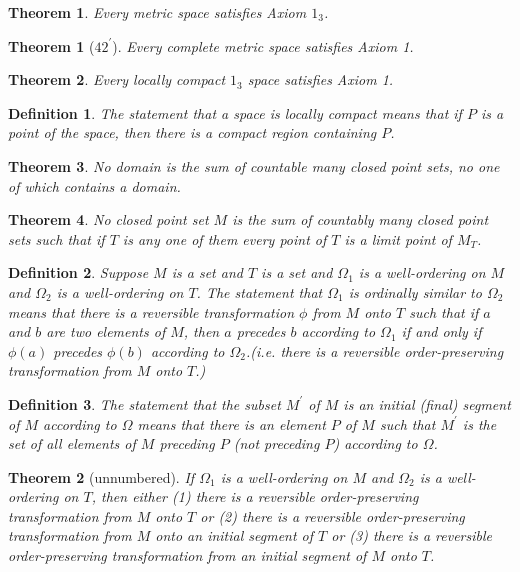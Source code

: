 \documentclass[10pt]{report}
\newtheorem{theorem}{Theorem}
\newtheorem*{theorem*}{Theorem}
\newtheorem{definition}{Definition}
\begin{document}
\begin{theorem}
 Every metric space satisfies Axiom $1_3$.
\end{theorem}

\begin{theorem*}[$42^\prime$]
 Every complete metric space satisfies Axiom 1.
\end{theorem*}

\begin{theorem}
 Every locally compact $1_3$ space satisfies Axiom 1.
\end{theorem}

\begin{definition}
 The statement that a space is locally compact means that if $P$ is a point of the space, then there is a compact
region containing $P$.
\end{definition}

\begin{theorem}
 No domain is the sum of countable many closed point sets, no one of which contains a domain.
\end{theorem}

\begin{theorem}
 No closed point set $M$ is the sum of countably many closed point sets such that if $T$ is any one of them every point
of $T$ is a limit point of $M_T$.
\end{theorem}

\begin{definition}
 Suppose $M$ is a set and $T$ is a set and $\Omega_1$ is a well-ordering on $M$ and $\Omega_2$ is a well-ordering on
$T$. The statement that $\Omega_1$ is ordinally similar to $\Omega_2$ means that there is a reversible transformation
$\phi$ from $M$ onto $T$ such that if $a$ and $b$ are two elements of $M$, then $a$ precedes $b$ according to $\Omega_1$
if and only if $\phi(a)$ precedes $\phi(b)$ according to $\Omega_2$.(i.e. there is a reversible order-preserving
transformation from $M$ onto $T$.)
\end{definition}

\begin{definition}
 The statement that the subset $M^\prime$ of $M$ is an initial (final) segment of $M$ according to $\Omega$ means that
there is an element $P$ of $M$ such that $M^\prime$ is the set of all elements of $M$ preceding $P$ (not preceding $P$)
according to $\Omega$.
\end{definition}

\begin{theorem*}[unnumbered] If $\Omega_1$ is a well-ordering on $M$ and $\Omega_2$ is a well-ordering on $T$, then
either (1) there is a reversible order-preserving transformation from $M$ onto $T$ or (2) there is a reversible
order-preserving transformation from $M$ onto an initial segment of $T$ or (3) there is a reversible order-preserving
transformation from an initial segment of $M$ onto $T$.
\end{theorem*}
\end{document}
